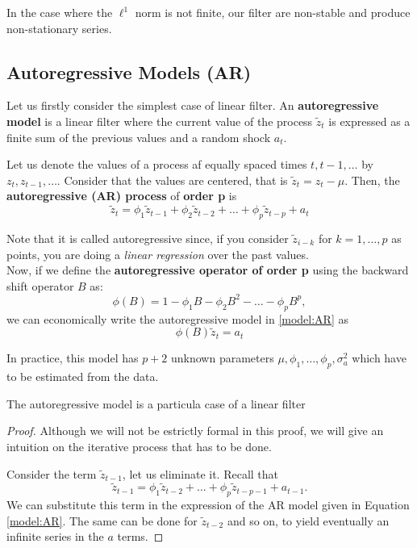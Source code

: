 In the case where the \(\ell^{1}\) norm is not finite, our filter are non-stable and produce non-stationary series.

\subsection{Autoregressive Models (AR)}

Let us firstly consider the simplest case of linear filter. An \textbf{autoregressive model} is a linear filter where the current value of the process \(\tilde z_{t}\) is expressed as a finite sum of the previous values and a random shock \(a_{t}\).

\begin{ndef}
  Let us denote the values of a process af equally spaced times \(t,t-1,\dots\) by \(z_{t}, z_{t-1}, \dots\). Consider that the values are centered, that is \(\tilde z_{t} = z_{t} - \mu\). Then, the \textbf{autoregressive (AR) process} of \textbf{order p} is
  \begin{equation}\label{model:AR}
    \tilde z_{t} = \phi_{1}\tilde z_{t-1} + \phi_{2}\tilde z_{t-2}+ \dots  + \phi_{p}\tilde z_{t-p} + a_{t}
    \end{equation}
\end{ndef}

Note that it is called autoregressive since, if you consider \(\tilde z_{i-k}\) for \(k = 1,\dots,p\) as points, you are doing a \emph{linear regression} over the past values.\\

Now, if we define the \textbf{autoregressive operator of order p} using the backward shift operator \(B\) as:
\[
\phi(B) = 1- \phi_{1}B - \phi_{2}B^{2} - \dots - \phi_{p}B^{p},
\]
we can economically write the autoregressive model in \eqref{model:AR} as
\begin{equation}\label{model:ar:red}
  \phi(B)\tilde z_{t} = a_{t}
\end{equation}

In practice, this model has \(p+2\) unknown parameters \(\mu,\phi_{1},\dots,\phi_{p},\sigma_{a}^{2}\) which have to be estimated from the data.

\begin{nprop}
The autoregressive model is a particula case of a linear filter
\end{nprop}
\begin{proof}
  Although we will not be estrictly formal in this proof, we will give an intuition on the iterative process that has to be done.

  Consider the term \(\tilde z_{t-1}\), let us eliminate it. Recall that
  \[
    \tilde z_{t-1} = \phi_{1}\tilde z_{t-2} + \dots + \phi_{p} \tilde z_{t-p-1} + a_{t-1}.
  \]
  We can substitute this term in the expression of the AR model given in Equation \eqref{model:AR}. The same can be done for \(\tilde z_{t-2}\) and so on, to yield eventually an infinite series in the \(a\) terms.

\end{proof}

